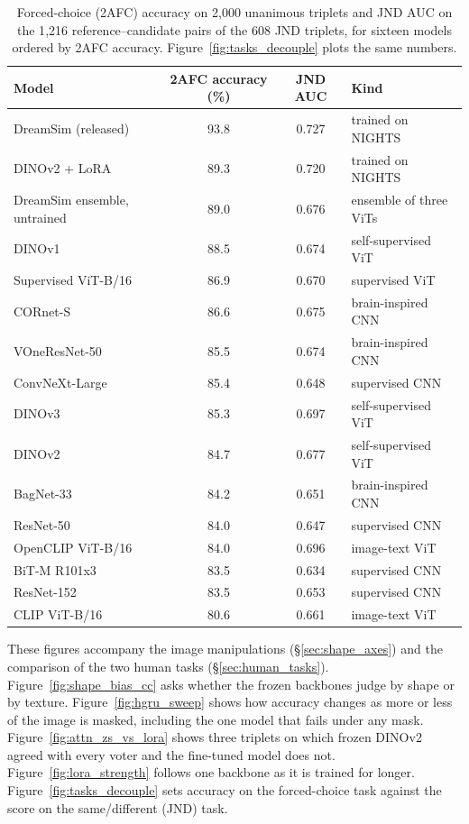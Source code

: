 \begin{table}[ht]
\caption{Forced-choice (2AFC) accuracy on 2{,}000 unanimous triplets and JND AUC on the 1{,}216 reference--candidate pairs of the 608 JND triplets, for sixteen models ordered by 2AFC accuracy. Figure~\ref{fig:tasks_decouple} plots the same numbers.}
\label{tab:axes}
\centering
\small
\begin{tabular}{lccl}
\toprule
Model & 2AFC accuracy (\%) & JND AUC & Kind \\
\midrule
DreamSim (released) & 93.8 & 0.727 & trained on NIGHTS \\
DINOv2 + LoRA & 89.3 & 0.720 & trained on NIGHTS \\
DreamSim ensemble, untrained & 89.0 & 0.676 & ensemble of three ViTs \\
DINOv1 & 88.5 & 0.674 & self-supervised ViT \\
Supervised ViT-B/16 & 86.9 & 0.670 & supervised ViT \\
CORnet-S & 86.6 & 0.675 & brain-inspired CNN \\
VOneResNet-50 & 85.5 & 0.674 & brain-inspired CNN \\
ConvNeXt-Large & 85.4 & 0.648 & supervised CNN \\
DINOv3 & 85.3 & 0.697 & self-supervised ViT \\
DINOv2 & 84.7 & 0.677 & self-supervised ViT \\
BagNet-33 & 84.2 & 0.651 & brain-inspired CNN \\
ResNet-50 & 84.0 & 0.647 & supervised CNN \\
OpenCLIP ViT-B/16 & 84.0 & 0.696 & image-text ViT \\
BiT-M R101x3 & 83.5 & 0.634 & supervised CNN \\
ResNet-152 & 83.5 & 0.653 & supervised CNN \\
CLIP ViT-B/16 & 80.6 & 0.661 & image-text ViT \\
\bottomrule
\end{tabular}
\end{table}

\clearpage
{}
\vspace{1em}

These figures accompany the image manipulations (\S\ref{sec:shape_axes}) and the comparison of the two human tasks (\S\ref{sec:human_tasks}). Figure~\ref{fig:shape_bias_cc} asks whether the frozen backbones judge by shape or by texture. Figure~\ref{fig:hgru_sweep} shows how accuracy changes as more or less of the image is masked, including the one model that fails under any mask. Figure~\ref{fig:attn_zs_vs_lora} shows three triplets on which frozen DINOv2 agreed with every voter and the fine-tuned model does not. Figure~\ref{fig:lora_strength} follows one backbone as it is trained for longer. Figure~\ref{fig:tasks_decouple} sets accuracy on the forced-choice task against the score on the same/different (JND) task.

